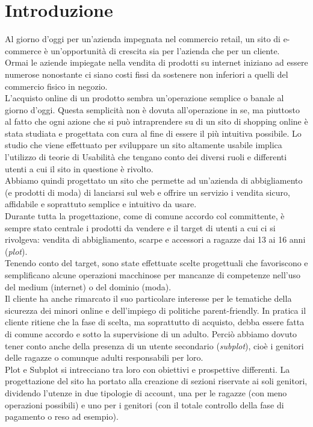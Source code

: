 \documentclass[12pt,a4paper]{report}
\begin{document}
\chapter{Introduzione}
Al giorno d'oggi per un'azienda impegnata nel commercio retail, un sito di e-commerce è un'opportunità di crescita sia per l'azienda che per un cliente.\\
Ormai le aziende impiegate nella vendita di prodotti su internet iniziano ad essere numerose nonostante ci siano costi fissi da sostenere non inferiori a quelli del commercio fisico in negozio.\\
L'acquisto online di un prodotto sembra un'operazione semplice o banale al giorno d'oggi. Questa semplicità non è dovuta all'operazione in se, ma piuttosto al fatto che ogni azione che si può intraprendere su di un sito di shopping online è stata studiata e progettata con cura al fine di essere il più intuitiva possibile. Lo studio che viene effettuato per sviluppare un sito altamente usabile implica l'utilizzo di teorie di Usabilità che tengano conto dei diversi ruoli e differenti utenti a cui il sito in questione è rivolto.\\
Abbiamo quindi progettato un sito che permette ad un'azienda di abbigliamento (e prodotti di moda) di lanciarsi sul web e offrire un servizio i vendita sicuro, affidabile e soprattuto semplice e intuitivo da usare.\\
Durante tutta la progettazione, come di comune accordo col committente, è sempre stato centrale i prodotti da vendere e il target di utenti a cui ci si rivolgeva: vendita di abbigliamento, scarpe e accessori a ragazze dai 13 ai 16 anni (\textit{plot}).\\
Tenendo conto del target, sono state effettuate scelte progettuali che favoriscono e semplificano alcune operazioni macchinose per mancanze di competenze nell'uso del medium (internet) o del dominio (moda).\\
Il cliente ha anche rimarcato il suo particolare interesse per le tematiche della sicurezza dei minori online e dell'impiego di politiche parent-friendly. In pratica il cliente ritiene che la fase di scelta, ma soprattutto di acquisto, debba essere fatta di comune accordo e sotto la supervisione di un adulto. Perciò abbiamo dovuto tener conto anche della presenza di un utente secondario (\textit{subplot}), cioè i genitori delle ragazze o comunque adulti responsabili per loro.\\
Plot e Subplot si intrecciano tra loro con obiettivi e prospettive differenti. La progettazione del sito ha portato alla creazione di sezioni riservate ai soli genitori, dividendo l'utenze in due tipologie di account, una per le ragazze (con meno operazioni possibili) e uno per i genitori (con il totale controllo della fase di pagamento o reso ad esempio).\\
\end{document}
